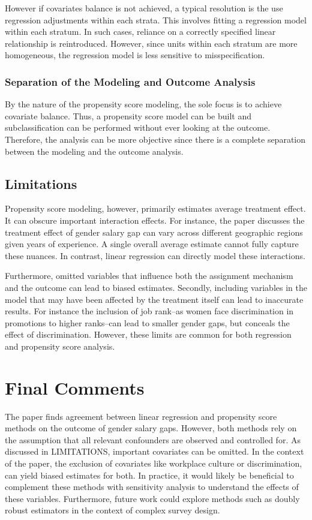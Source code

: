 \documentclass[12pt]{article}
\begin{document}
However if covariates balance is not achieved, a typical resolution is the use regression adjustments within each strata. This involves fitting a regression model within each stratum. In such cases, reliance on a correctly specified linear relationship is reintroduced. However, since units within each stratum are more homogeneous, the regression model is less sensitive to misspecification. 


\subsubsection{Separation of the Modeling and Outcome Analysis}

By the nature of the propensity score modeling, the sole focus is to achieve covariate balance. Thus, a propensity score model can be built and subclassification can be performed without ever looking at the outcome. Therefore, the analysis can be more objective since there is a complete separation between the modeling and the outcome analysis.

\subsection{Limitations}

Propensity score modeling, however, primarily estimates average treatment effect. It can obscure important interaction effects. For instance, the paper discusses the treatment effect of gender salary gap can vary across different geographic regions given years of experience. A single overall average estimate cannot fully capture these nuances. In contrast, linear regression can directly model these interactions.

Furthermore, omitted variables that influence both the assignment mechanism and the outcome can lead to biased estimates. Secondly, including variables in the model that may have been affected by the treatment itself can lead to inaccurate results. For instance the inclusion of job rank--as women face discrimination in promotions to higher ranks--can lead to smaller gender gaps, but conceals the effect of discrimination. However, these limits are common for both regression and propensity score analysis.

\section{Final Comments}

The paper finds agreement between linear regression and propensity score methods on the outcome of gender salary gaps. However, both methods rely on the assumption that all relevant confounders are observed and controlled for. As discussed in {LIMITATIONS}, important covariates can be omitted. In the context of the paper, the exclusion of covariates like workplace culture or discrimination, can yield biased estimates for both. In practice, it would likely be beneficial to complement these methods with sensitivity analysis to understand the effects of these variables. Furthermore, future work could explore methods such as doubly robust estimators in the context of complex survey design. 
\end{document}
